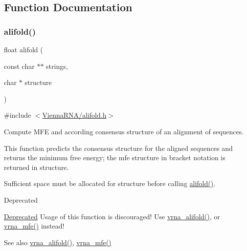 \subsection{Function Documentation}
\mbox{\label{group__mfe__global__deprecated_ga4cf00f0659e5f0480335d69e797f05b1}} 
\subsubsection{\texorpdfstring{alifold()}{alifold()}}
{\footnotesize\ttfamily float alifold (\begin{DoxyParamCaption}\item[{const char $\ast$$\ast$}]{strings,  }\item[{char $\ast$}]{structure }\end{DoxyParamCaption})}



{\ttfamily \#include $<$\hyperlink{alifold_8h}{Vienna\+R\+N\+A/alifold.\+h}$>$}



Compute M\+FE and according consensus structure of an alignment of sequences. 

This function predicts the consensus structure for the aligned \textquotesingle{}sequences\textquotesingle{} and returns the minimum free energy; the mfe structure in bracket notation is returned in \textquotesingle{}structure\textquotesingle{}.

Sufficient space must be allocated for \textquotesingle{}structure\textquotesingle{} before calling \hyperlink{group__mfe__global__deprecated_ga4cf00f0659e5f0480335d69e797f05b1}{alifold()}.

\begin{DoxyRefDesc}{Deprecated}
\item[\hyperlink{deprecated__deprecated000012}{Deprecated}]Usage of this function is discouraged! Use \hyperlink{group__mfe__global_ga6c9d3bef3e92c6d423ffac9f981418c1}{vrna\+\_\+alifold()}, or \hyperlink{group__mfe__global_gabd3b147371ccf25c577f88bbbaf159fd}{vrna\+\_\+mfe()} instead! \end{DoxyRefDesc}
\begin{DoxySeeAlso}{See also}
\hyperlink{group__mfe__global_ga6c9d3bef3e92c6d423ffac9f981418c1}{vrna\+\_\+alifold()}, \hyperlink{group__mfe__global_gabd3b147371ccf25c577f88bbbaf159fd}{vrna\+\_\+mfe()}
\end{DoxySeeAlso}

